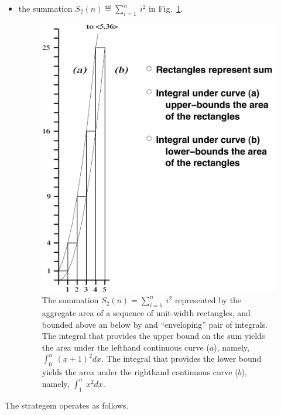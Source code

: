 \begin{itemize}
\item
the summation $S_2(n) \eqdef \sum_{i=1}^n \ i^2$ in
Fig.~\ref{fig:riemann-n2}.
\begin{figure}[htb]
\centerline{
\includegraphics[scale=0.42]{riemann.pdf}
}
\caption{The summation $S_2(n) = \sum_{i=1}^n \ i^2$ represented by
  the aggregate area of a sequence of unit-width rectangles, and
  bounded above an below by and ``enveloping'' pair of integrals.  The
  integral that provides the upper bound on the sum yields the area
  under the lefthand continuous curve ($a$), namely, $\int_0^n
  \ (x+1)^2 dx$.  The integral that provides the lower bound yields
  the area under the righthand continuous curve ($b$), namely,
  $\int_1^n \ x^2 dx$.}
\label{fig:riemann-n2}
\end{figure}
\end{itemize}
The strategem operates as follows.

